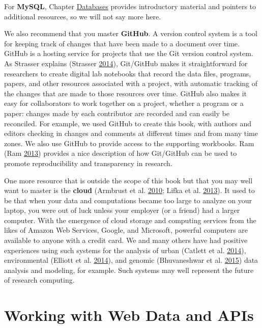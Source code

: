 \documentclass[]{krantz}
\begin{document}
For \textbf{MySQL}, Chapter \protect\hyperlink{chap:db}{Databases}
provides introductory material and pointers to additional resources, so
we will not say more here.

We also recommend that you master \textbf{GitHub}. A version control
system is a tool for keeping track of changes that have been made to a
document over time. GitHub is a hosting service for projects that use
the Git version control system. As Strasser explains (Strasser
\protect\hyperlink{ref-GitResearch}{2014}), Git/GitHub makes it
straightforward for researchers to create digital lab notebooks that
record the data files, programs, papers, and other resources associated
with a project, with automatic tracking of the changes that are made to
those resources over time. GitHub also makes it easy for collaborators
to work together on a project, whether a program or a paper: changes
made by each contributor are recorded and can easily be reconciled. For
example, we used GitHub to create this book, with authors and editors
checking in changes and comments at different times and from many time
zones. We also use GitHub to provide access to the supporting workbooks.
Ram (Ram \protect\hyperlink{ref-ram2013git}{2013}) provides a nice
description of how Git/GitHub can be used to promote reproducibility and
transparency in research.

One more resource that is outside the scope of this book but that you
may well want to master is the \textbf{cloud} (Armbrust et al.
\protect\hyperlink{ref-armbrust2010view}{2010}; Lifka et al.
\protect\hyperlink{ref-Lifka}{2013}). It used to be that when your data
and computations became too large to analyze on your laptop, you were
out of luck unless your employer (or a friend) had a larger computer.
With the emergence of cloud storage and computing services from the
likes of Amazon Web Services, Google, and Microsoft, powerful computers
are available to anyone with a credit card. We and many others have had
positive experiences using such systems for the analysis of urban
(Catlett et al. \protect\hyperlink{ref-plenario}{2014}), environmental
(Elliott et al. \protect\hyperlink{ref-elliott2014parallel}{2014}), and
genomic (Bhuvaneshwar et al.
\protect\hyperlink{ref-bhuvaneshwar2015case}{2015}) data analysis and
modeling, for example. Such systems may well represent the future of
research computing.

\hypertarget{chap:web}{\chapter{Working with Web Data and
APIs}\label{chap:web}}
\end{document}
